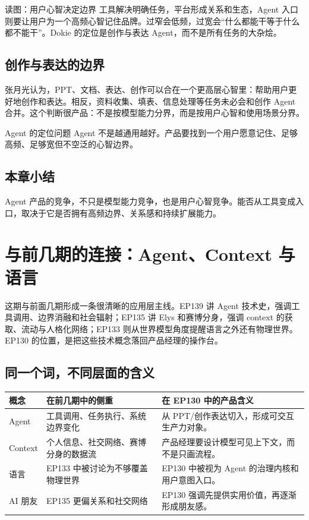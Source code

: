 \documentclass[a4paper]{article}
\begin{document}
\begin{knowledgebox}{读图：用户心智决定边界}
工具解决明确任务，平台形成关系和生态，Agent 入口则要让用户为一个高频心智记住品牌。过窄会低频，过宽会“什么都能干等于什么都不能干”。Dokie 的定位是创作与表达 Agent，而不是所有任务的大杂烩。
\end{knowledgebox}

\subsection{创作与表达的边界}

张月光认为，PPT、文档、表达、创作可以合在一个更高层心智里：帮助用户更好地创作和表达。相反，资料收集、填表、信息处理等任务未必会和创作 Agent 合并。这个判断很产品：不是按模型能力分界，而是按用户心智和使用场景分界。

\begin{importantbox}{Agent 的定位问题}
Agent 不是越通用越好。产品要找到一个用户愿意记住、足够高频、足够宽但不空泛的心智边界。
\end{importantbox}

\subsection{本章小结}

Agent 产品的竞争，不只是模型能力竞争，也是用户心智竞争。能否从工具变成入口，取决于它是否拥有高频边界、关系感和持续扩展能力。

\section{与前几期的连接：Agent、Context 与语言}

这期与前面几期形成一条很清晰的应用层主线。EP139 讲 Agent 技术史，强调工具调用、边界消融和社会辐射；EP135 讲 Elys 和赛博分身，强调 context 的获取、流动与人格化网络；EP133 则从世界模型角度提醒语言之外还有物理世界。EP130 的位置，是把这些技术概念落回产品经理的操作台。

\subsection{同一个词，不同层面的含义}

\begin{longtable}{p{}p{}p{}}
\toprule
概念 & 在前几期中的侧重 & 在 EP130 中的产品含义 \\
\midrule
Agent & 工具调用、任务执行、系统边界变化 & 从 PPT/创作表达切入，形成可交互生产力对象。 \\
Context & 个人信息、社交网络、赛博分身的数据流 & 产品经理要设计模型可见上下文，而不是只画流程。 \\
语言 & EP133 中被讨论为不够覆盖物理世界 & EP130 中被视为 Agent 的治理内核和用户意图入口。 \\
AI 朋友 & EP135 更偏关系和社交网络 & EP130 强调先提供实用价值，再逐渐形成朋友感。 \\
\bottomrule
\end{longtable}
\end{document}

